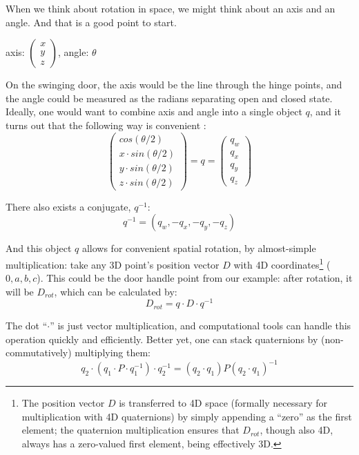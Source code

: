 When we think about rotation in space, we might think about an axis and an angle.
And that is a good point to start.

\begin{center}
axis: \(\begin{pmatrix}x\\y\\z \end{pmatrix}\), angle: \(\theta\)
\end{center}

On the swinging door, the axis would be the line through the hinge points, and the angle could be measured as the radians separating open and closed state.
Ideally, one would want to combine axis and angle into a single object \(q\), and it turns out that the following way is convenient \citep{Pennestri2010,Challis2020,Flashner2019}:
\begin{equation}\label{eqn:quaternion}
\begin{pmatrix}cos(\theta/2)\\x\cdot sin(\theta/2)\\y\cdot sin(\theta/2)\\z\cdot sin(\theta/2) \end{pmatrix} = q = \begin{pmatrix}q_w\\q_x\\q_y\\q_z \end{pmatrix}
\end{equation}

There also exists a conjugate, \(q^{-1}\):
\[q^{-1} = (q_w, -q_x, -q_y, -q_z)\]


And this object \(q\) allows for convenient spatial rotation, by almost-simple multiplication:
take any 3D point's position vector \(D\) with 4D coordinates\footnote{The position vector \(D\) is transferred to 4D space (formally necessary for multiplication with 4D quaternions) by simply appending a ``zero'' as the first element; the quaternion multiplication ensures that \(D_{rot}\), though also 4D, always has a zero-valued first element, being effectively 3D.} (\(0, a, b, c\)).
This could be the door handle point from our example: after rotation, it will be \(D_{rot}\), which can be calculated by:
\[D_{rot} = q\cdot D\cdot q^{-1}\]


The dot ``\(\cdot\)'' is just vector multiplication, and computational tools can handle this operation quickly and efficiently.
Better yet, one can stack quaternions by (non-commutatively) multiplying them:
\[ q_2 \cdot \left( q_1\cdot P\cdot q_1^{-1}\right) \cdot q_2^{-1} = (q_2\cdot q_1) P (q_2\cdot q_1)^{-1} \]

